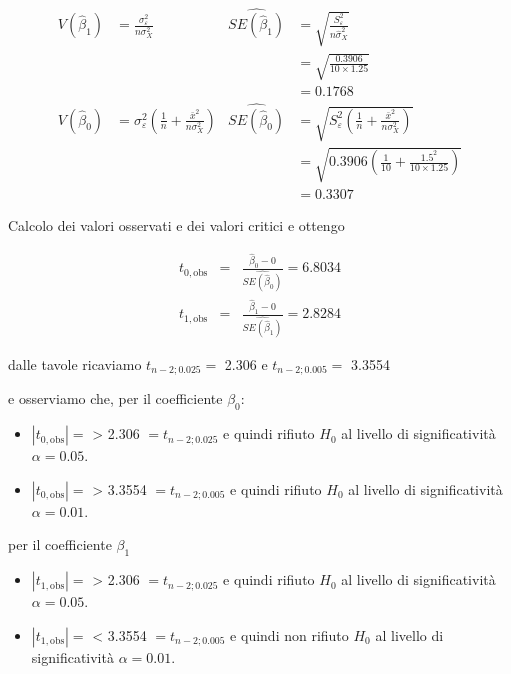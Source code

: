 \documentclass[
  11pt,
]{book}
\providecommand{\tightlist}{%
  \setlength{\itemsep}{0pt}\setlength{\parskip}{0pt}}
\theoremstyle{mytheoremstyle}
\theoremstyle{mydefstyle}
\begin{document}
\[\begin{aligned}
V(\hat\beta_1)&=\frac{\sigma_\varepsilon^2}{n\sigma_X^2} &\widehat {SE(\hat\beta_1)}&=\sqrt{\frac{S_\varepsilon^2}{n\hat\sigma_X^2}}\\
              &                                          &&=\sqrt{\frac{0.3906}{10\times1.25}}\\
              &&&=0.1768\\
V(\hat\beta_0)&=\sigma_\varepsilon^2\left(\frac 1 n +\frac{\bar x^2}{n\sigma_X^2}\right) 
&\widehat {SE(\hat\beta_0)} &= \sqrt{S_\varepsilon^2\left(\frac 1 n +\frac{\bar x^2}{n\sigma_X^2}\right)}\\
                &&           &= \sqrt{0.3906\left(\frac 1 {10} +\frac{1.5^2}{10\times 1.25}\right)}\\
                  &&         &= 0.3307
\end{aligned}\]

Calcolo dei valori osservati e dei valori critici e ottengo

\begin{eqnarray*}
t_{0,\text{obs}} &=& \frac{\hat\beta_0-0}{\widehat{SE(\hat\beta_0)}}=6.8034\\
t_{1,\text{obs}} &=&  \frac{\hat\beta_1-0}{\widehat{SE(\hat\beta_1)}}=2.8284
\end{eqnarray*}

dalle tavole ricaviamo \(t_{n-2;0.025}=\) 2.306 e \(t_{n-2;0.005}=\) 3.3554

e osserviamo che, per il coefficiente \(\beta_0\):

\begin{itemize}
\tightlist
\item
  \(|t_{0,\text{obs}}|=\) \textbar{} \textgreater{} 2.306 \(=t_{n-2;0.025}\) e quindi rifiuto \(H_0\) al livello di significatività \(\alpha=0.05\).
\item
  \(|t_{0,\text{obs}}|=\) \textbar{} \textgreater{} 3.3554 \(=t_{n-2;0.005}\) e quindi rifiuto \(H_0\) al livello di significatività \(\alpha=0.01\).
\end{itemize}

per il coefficiente \(\beta_1\)

\begin{itemize}
\tightlist
\item
  \(|t_{1,\text{obs}}|=\) \textbar{} \textgreater{} 2.306 \(=t_{n-2;0.025}\) e quindi rifiuto \(H_0\) al livello di significatività \(\alpha=0.05\).
\item
  \(|t_{1,\text{obs}}|=\) \textbar{} \textless{} 3.3554 \(=t_{n-2;0.005}\) e quindi non rifiuto \(H_0\) al livello di significatività \(\alpha=0.01\).
\end{itemize}
\end{document}
